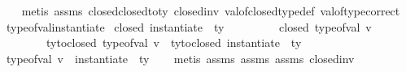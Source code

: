 \begin{isabellebody}
%
\isadelimproof
\ \ %
\endisadelimproof
%
\isatagproof
{}\isamarkupfalse%
\ {\isacharparenleft}{\kern0pt}metis\ assms\ closed{\isacharunderscore}{\kern0pt}closed{\isacharunderscore}{\kern0pt}to{\isacharunderscore}{\kern0pt}ty\ closed{\isacharunderscore}{\kern0pt}inv{}\ val{\isacharunderscore}{\kern0pt}of{\isacharunderscore}{\kern0pt}closed{\isacharunderscore}{\kern0pt}type{\isacharunderscore}{\kern0pt}def\ val{\isacharunderscore}{\kern0pt}of{\isacharunderscore}{\kern0pt}type{\isacharunderscore}{\kern0pt}correct{\isacharparenright}{\kern0pt}%
\endisatagproof
{\isafoldproof}%
%
\isadelimproof
\isanewline
%
\endisadelimproof
\isanewline
{}\isamarkupfalse%
\ type{\isacharunderscore}{\kern0pt}of{\isacharunderscore}{\kern0pt}val{\isacharunderscore}{\kern0pt}instantiate{\isacharcolon}{\kern0pt}\isanewline
{}\ {\isachardoublequoteopen}closed\ {\isacharparenleft}{\kern0pt}instantiate\ {\isasymOmega}\ ty{\isacharparenright}{\kern0pt}{\isachardoublequoteclose}\ \isanewline
\ \ \ \ \ \ \ \ {\isachardoublequoteopen}closed\ {\isacharparenleft}{\kern0pt}type{\isacharunderscore}{\kern0pt}of{\isacharunderscore}{\kern0pt}val\ v{\isacharparenright}{\kern0pt}{\isachardoublequoteclose}\ \isanewline
\ \ \ \ \ \ \ \ {\isachardoublequoteopen}ty{\isacharunderscore}{\kern0pt}to{\isacharunderscore}{\kern0pt}closed\ {\isacharparenleft}{\kern0pt}type{\isacharunderscore}{\kern0pt}of{\isacharunderscore}{\kern0pt}val\ v{\isacharparenright}{\kern0pt}\ {\isacharequal}{\kern0pt}\ ty{\isacharunderscore}{\kern0pt}to{\isacharunderscore}{\kern0pt}closed\ {\isacharparenleft}{\kern0pt}instantiate\ {\isasymOmega}\ ty{\isacharparenright}{\kern0pt}{\isachardoublequoteclose}\isanewline
{}\ {\isachardoublequoteopen}{\isacharparenleft}{\kern0pt}type{\isacharunderscore}{\kern0pt}of{\isacharunderscore}{\kern0pt}val\ v{\isacharparenright}{\kern0pt}\ {\isacharequal}{\kern0pt}\ {\isacharparenleft}{\kern0pt}instantiate\ {\isasymOmega}\ ty{\isacharparenright}{\kern0pt}{\isachardoublequoteclose}\isanewline
%
\isadelimproof
\ \ %
\endisadelimproof
%
\isatagproof
{}\isamarkupfalse%
\ {\isacharparenleft}{\kern0pt}metis\ assms{\isacharparenleft}{\kern0pt}{}{\isacharparenright}{\kern0pt}\ assms{\isacharparenleft}{\kern0pt}{}{\isacharparenright}{\kern0pt}\ assms{\isacharparenleft}{\kern0pt}{}{\isacharparenright}{\kern0pt}\ closed{\isacharunderscore}{\kern0pt}inv{}{\isacharparenright}{\kern0pt}%
\endisatagproof
{\isafoldproof}%

\end{isabellebody}
